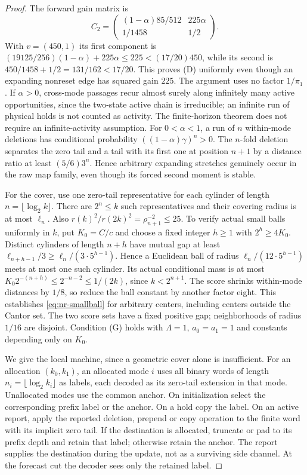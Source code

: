\begin{proof}
The forward gain matrix is
\begin{equation}\label{eq:nr-C2}
 C_2=\begin{pmatrix}(1-\alpha)85/512&225\alpha\\[1mm]1/1458&1/2\end{pmatrix}.
\end{equation}
With $v=(450,1)$ its first component is $(19125/256)(1-\alpha)+225\alpha\le225<(17/20)450$, while its second is $450/1458+1/2=131/162<17/20$. This proves \textup{(D)} uniformly even though an expanding nonreset edge has squared gain $225$. The argument uses no factor $1/\pi_1$. If $\alpha>0$, cross-mode passages recur almost surely along infinitely many active opportunities, since the two-state active chain is irreducible; an infinite run of physical holds is not counted as activity. The finite-horizon theorem does not require an infinite-activity assumption. For $0<\alpha<1$, a run of $n$ within-mode deletions has conditional probability $((1-\alpha)\gamma)^n>0$. The $n$-fold deletion separates the zero tail and a tail with its first one at position $n+1$ by a distance ratio at least $(5/6)3^n$. Hence arbitrary expanding stretches genuinely occur in the raw map family, even though its forced second moment is stable.

For the cover, use one zero-tail representative for each cylinder of length $n=\lfloor\log_2 k\rfloor$. There are $2^n\le k$ such representatives and their covering radius is at most $\ell_n$. Also $r(k)^2/r(2k)^2=\rho_{n+1}^{-2}\le25$. To verify actual small balls uniformly in $k$, put $K_0=C/c$ and choose a fixed integer $h\ge1$ with $2^h\ge4K_0$. Distinct cylinders of length $n+h$ have mutual gap at least $\ell_{n+h-1}/3\ge\ell_n/(3\cdot5^{h-1})$. Hence a Euclidean ball of radius $\ell_n/(12\cdot5^{h-1})$ meets at most one such cylinder. Its actual conditional mass is at most $K_0 2^{-(n+h)}\le2^{-n-2}\le1/(2k)$, since $k<2^{n+1}$. The score shrinks within-mode distances by $1/8$, so reduce the ball constant by another factor eight. This establishes \eqref{eq:nr-smallball} for arbitrary centers, including centers outside the Cantor set. The two score sets have a fixed positive gap; neighborhoods of radius $1/16$ are disjoint. Condition \textup{(G)} holds with $\Lambda=1$, $a_0=a_1=1$ and constants depending only on $K_0$.

We give the local machine, since a geometric cover alone is insufficient. For an allocation $(k_0,k_1)$, an allocated mode $i$ uses all binary words of length $n_i=\lfloor\log_2 k_i\rfloor$ as labels, each decoded as its zero-tail extension in that mode. Unallocated modes use the common anchor. On initialization select the corresponding prefix label or the anchor. On a hold copy the label. On an active report, apply the reported deletion, prepend or copy operation to the finite word with its implicit zero tail. If the destination is allocated, truncate or pad to its prefix depth and retain that label; otherwise retain the anchor. The report supplies the destination during the update, not as a surviving side channel. At the forecast cut the decoder sees only the retained label.


\end{proof}
